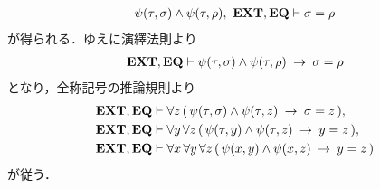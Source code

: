 \begin{sketch}
\begin{description}
\begin{align}
					\psi(\tau,\sigma) \wedge \psi(\tau,\rho),\ \EXTAX,\EQAX 
					\vdash \sigma = \rho
				\end{align}
				が得られる．ゆえに演繹法則より
				\begin{align}
					\mbox{{\bf EXT}},\mbox{{\bf EQ}} \vdash \psi(\tau,\sigma) \wedge \psi(\tau,\rho)
					\hspace{0.25em}\rightarrow\hspace{0.25em} \sigma = \rho
				\end{align}
				となり，全称記号の推論規則より
				\begin{align}
					\mbox{{\bf EXT}},\mbox{{\bf EQ}} &\vdash \forall z\, 
						(\, \psi(\tau,\sigma) \wedge \psi(\tau,z) 
						\hspace{0.25em}\rightarrow\hspace{0.25em} \sigma = z\, ), \\
					\mbox{{\bf EXT}},\mbox{{\bf EQ}} &\vdash \forall y\, \forall z\, 
						(\, \psi(\tau,y) \wedge \psi(\tau,z) \hspace{0.25em}\rightarrow\hspace{0.25em} y = z\, ), \\
					\mbox{{\bf EXT}},\mbox{{\bf EQ}} &\vdash \forall x\, \forall y\, \forall z\, 
						(\, \psi(x,y) \wedge \psi(x,z) \hspace{0.25em}\rightarrow\hspace{0.25em} y = z\, )
				\end{align}
				が従う．
			

\end{description}
\end{sketch}
